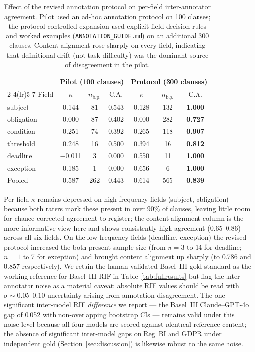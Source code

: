 \documentclass{article}
\begin{document}
\begin{table}[!htbp]
\caption{Effect of the revised annotation protocol on per-field
inter-annotator agreement. Pilot used an ad-hoc annotation
protocol on 100 clauses; the protocol-controlled expansion used
explicit field-decision rules and worked examples
(\texttt{ANNOTATION\_GUIDE.md}) on an additional 300 clauses.
Content alignment rose sharply on every field, indicating that
definitional drift (not task difficulty) was the dominant source
of disagreement in the pilot.}
\centering
\small
\setlength{\tabcolsep}{4pt}
\begin{tabular}{lcccccc}
\toprule
& \multicolumn{3}{c}{Pilot (100 clauses)} & \multicolumn{3}{c}{Protocol (300 clauses)} \\
\cmidrule(lr){2-4}\cmidrule(lr){5-7}
Field & $\kappa$ & $n_{\text{b.p.}}$ & C.A. & $\kappa$ & $n_{\text{b.p.}}$ & C.A. \\
\midrule
subject     & 0.144  & 81 & 0.543 & 0.128 & 132 & \textbf{1.000} \\
obligation  & 0.000  & 87 & 0.402 & 0.000 & 282 & \textbf{0.727} \\
condition   & 0.251  & 74 & 0.392 & 0.265 & 118 & \textbf{0.907} \\
threshold   & 0.248  & 16 & 0.500 & 0.394 & 16  & \textbf{0.812} \\
deadline    & $-$0.011 & 3  & 0.000 & 0.550 & 11  & \textbf{1.000} \\
exception   & 0.185  & 1  & 0.000 & 0.656 & 6   & \textbf{1.000} \\
\midrule
Pooled      & 0.587  & 262 & 0.443 & 0.614 & 565 & \textbf{0.839} \\
\bottomrule
\end{tabular}
\label{tab:protocol_effect}
\end{table} Per-field $\kappa$
remains depressed on high-frequency fields (subject, obligation)
because both raters mark these present in over 90\% of clauses,
leaving little room for chance-corrected agreement to register; the
content-alignment column is the more informative view here and shows
consistently high agreement (0.65--0.86) across all six fields. On
the low-frequency fields (deadline, exception) the revised protocol
increased the both-present sample size (from $n=3$ to 14 for
deadline; $n=1$ to 7 for exception) and brought content alignment
up sharply (to 0.786 and 0.857 respectively).
We retain the human-validated Basel~III gold standard as the
working reference for Basel~III RIF in Table~\ref{tab:fullresults}
but flag the inter-annotator noise as a material caveat: absolute
RIF values should be read with $\sigma \sim 0.05$--$0.10$
uncertainty arising from annotation disagreement. The one
significant inter-model RIF \emph{difference} we report --- the
Basel~III Claude--GPT-4o gap of 0.052 with non-overlapping bootstrap
CIs --- remains valid under this noise level because all four models
are scored against identical reference content; the absence of
significant inter-model gaps on Reg~BI and GDPR under independent
gold (Section~\ref{sec:discussion}) is likewise robust to the same
noise.
\end{document}
